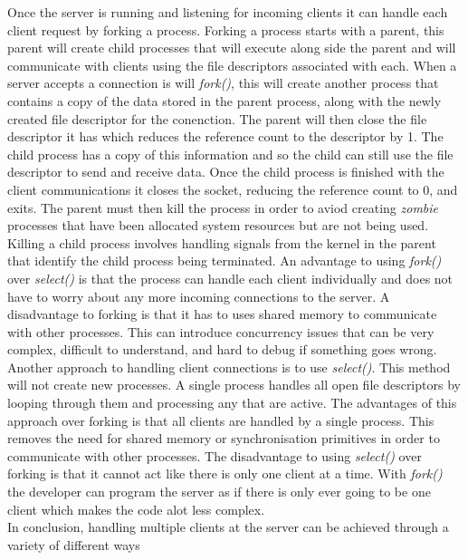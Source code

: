 \documentclass[12pt,a4paper,titlepage]{article}
\begin{document}
Once the server is running and listening for incoming clients it can handle each client request by forking a process. Forking a process starts with a parent, this parent will create child processes that will execute along side the parent and will communicate with clients using the file descriptors associated with each. When a server accepts a connection is will \textit{fork()}, this will create another process that contains a copy of the data stored in the parent process, along with the newly created file descriptor for the conenction. The parent will then close the file descriptor it has which reduces the reference count to the descriptor by 1. The child process has a copy of this information and so the child can still use the file descriptor to send and receive data. Once the child process is finished with the client communications it closes the socket, reducing the reference count to 0, and exits. The parent must then kill the process in order to aviod creating \textit{zombie} processes that have been allocated system resources but are not being used. Killing a child process involves handling signals from the kernel in the parent that identify the child process being terminated. An advantage to using \textit{fork()} over \textit{select()} is that the process can handle each client individually and does not have to worry about any more incoming connections to the server. A disadvantage to forking is that it has to uses shared memory to communicate with other processes. This can introduce concurrency issues that can be very complex, difficult to understand, and hard to debug if something goes wrong.\\

Another approach to handling client connections is to use \textit{select()}. This method will not create new processes. A single process handles all open file descriptors by looping through them and processing any that are active. The advantages of this approach over forking is that all clients are handled by a single process. This removes the need for shared memory or synchronisation primitives in order to communicate with other processes.\cite{theworldofselect} The disadvantage to using \textit{select()} over forking is that it cannot act like there is only one client at a time. With \textit{fork()} the developer can program the server as if there is only ever going to be one client which makes the code alot less complex. \\

In conclusion, handling multiple clients at the server can be achieved through a variety of different ways 
\end{document}
